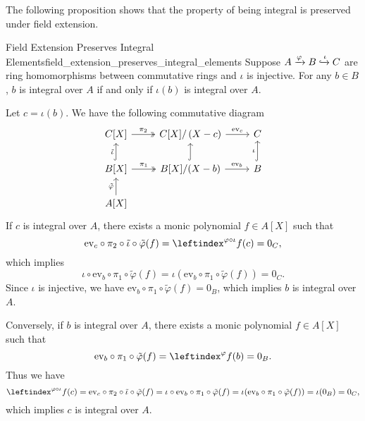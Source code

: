 The following proposition shows that the property of being integral is preserved under field extension.
\begin{proposition}{Field Extension Preserves Integral Elements}{field_extension_preserves_integral_elements}
    Suppose $A\xrightarrow{\varphi} B\xhookrightarrow{\iota} C$ are ring homomorphisms between commutative rings and $\iota$ is injective. For any $b\in B$, $b$ is integral over $A$ if and only if $\iota(b)$ is integral over $A$.
\end{proposition}
\begin{prf}
   Let $c=\iota(b)$. We have the following commutative diagram
    \[
        \begin{tikzcd}
            {C[X]} \arrow[r, "\pi_2", two heads]                                  & {C[X]/\left(X-c\right)} \arrow[r, "\mathrm{ev}_c"]      & C                          \\
            {B[X]} \arrow[u, "\tilde{\iota}", hook] \arrow[r, "\pi_1", two heads] & {B[X]/(X-b)} \arrow[r, "\mathrm{ev}_b"] \arrow[u, hook] & B \arrow[u, "\iota", hook] \\
            {A[X]} \arrow[u, "\tilde{\varphi}"]                                   &                                                         &                           
            \end{tikzcd}
    \]
    If $c$ is integral over $A$, there exists a monic polynomial $f\in A[X]$ such that 
    \[
    \mathrm{ev}_c\circ\pi_2\circ\tilde{\iota}\circ\tilde{\varphi}(f)=\leftindex^{\varphi\circ\iota}f(c)=0_C,
    \]
    which implies 
    \[
        \iota\circ\mathrm{ev}_b\circ \pi_1\circ\tilde{\varphi}(f)=\iota(\mathrm{ev}_b\circ \pi_1\circ\tilde{\varphi}(f))=0_C.
    \]
    Since $\iota$ is injective, we have $\mathrm{ev}_b\circ \pi_1\circ\tilde{\varphi}(f)=0_B$, which implies $b$ is integral over $A$.

    Conversely, if $b$ is integral over $A$, there exists a monic polynomial $f\in A[X]$ such that
    \[
        \mathrm{ev}_b\circ \pi_1\circ\tilde{\varphi}(f)=\leftindex^{\varphi}f(b)=0_B.
    \]
    Thus we have
    \[
        \leftindex^{\varphi\circ\iota}f(c)=\mathrm{ev}_c\circ\pi_2\circ\tilde{\iota}\circ\tilde{\varphi}(f)=\iota\circ\mathrm{ev}_b\circ \pi_1\circ\tilde{\varphi}(f)=\iota(\mathrm{ev}_b\circ \pi_1\circ\tilde{\varphi}(f))=\iota(0_B)=0_C,
    \]
    which implies $c$ is integral over $A$.
\end{prf}


